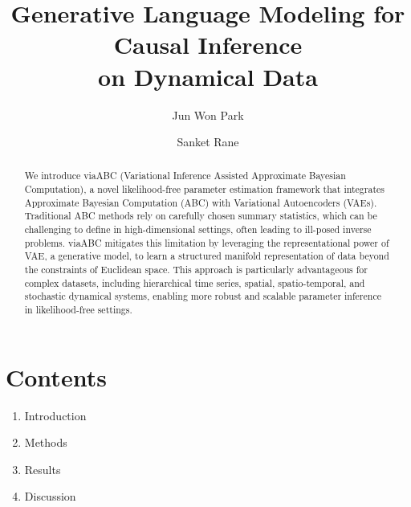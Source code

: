 \documentclass[12pt]{article} %
\begin{document}
\title{Generative Language Modeling for Causal Inference\\ on Dynamical Data}
\author[1]{Jun Won Park}
\author[1]{Sanket Rane}

\maketitle

\newpage

\section*{Contents}

\begin{enumerate}
\item Introduction
\vspace{6mm}
\item Methods
\vspace{6mm}
\item Results
\vspace{6mm}
\item Discussion
\end{enumerate}

\newpage

\begin{abstract}
We introduce viaABC (Variational Inference Assisted Approximate Bayesian Computation), a novel likelihood-free parameter estimation framework that integrates Approximate Bayesian Computation (ABC) with Variational Autoencoders (VAEs). Traditional ABC methods rely on carefully chosen summary statistics, which can be challenging to define in high-dimensional settings, often leading to ill-posed inverse problems. viaABC mitigates this limitation by leveraging the representational power of VAE, a generative model, to learn a structured manifold representation of data beyond the constraints of Euclidean space. This approach is particularly advantageous for complex datasets, including hierarchical time series, spatial, spatio-temporal, and stochastic dynamical systems, enabling more robust and scalable parameter inference in likelihood-free settings.
\end{abstract}
\end{document}
